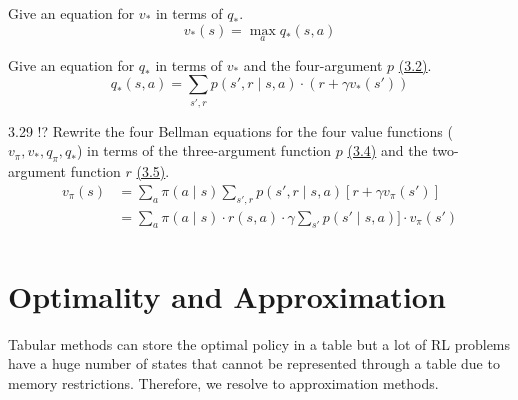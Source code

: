 \begin{exercise}{3.25}
    Give an equation for $v_*$ in terms of $q_*$.
    \[
        v_*(s) = \max_a q_*(s,a)
    \]
\end{exercise}
\begin{exercise}{3.26}
    Give an equation for $q_*$ in terms of $v_*$ and the four-argument
    $p$ \hyperref[eq:3.2]{(3.2)}.
    \[
        q_*(s, a) = \sum_{s',r}p(s',r\mid s,a)\cdot(r + \gamma v_*(s'))
    \]
\end{exercise}
\begin{exercise}{3.29 !?}
    Rewrite the four Bellman equations for the four value functions
    ($v_{\pi}, v_*, q_{\pi}, q_*$) in terms of the three-argument
    function $p$ \hyperref[eq:3.4]{(3.4)} and the two-argument
    function $r$ \hyperref[eq:3.5]{(3.5)}.
    \[
        \begin{aligned}
            v_{\pi}(s)&=\sum_a\pi(a\mid s)
            \sum_{s', r}p(s',r\mid s,a)\left[r+\gamma v_{\pi}(s')\right] \\
            &=\sum_a\pi(a\mid s)\cdot r(s,a)\cdot\gamma
            \sum_{s'}p(s'\mid s,a)]\cdot v_{\pi}(s') \\
        \end{aligned}
    \]
\end{exercise}

\section{Optimality and Approximation}
Tabular methods can store the optimal policy in a table but a lot of RL problems have
a huge number of states that cannot be represented through a table due to memory restrictions.
Therefore, we resolve to approximation methods.


